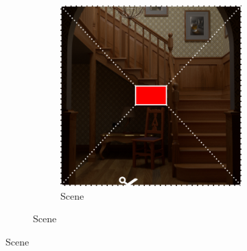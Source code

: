 \begin{figure}[]
    \centering    
    \begin{subfigure}{\textwidth}
        \centering
        \begin{subfigure}{0.5\textwidth}
            \centering
            \includegraphics[width=\textwidth]{images/04-experiment03/staircase_illum/scene.jpg}
            \caption{Scene}
            \label{fig:ex03-staircase_illum-scene}
        \end{subfigure}


\end{subfigure}
\end{figure}
